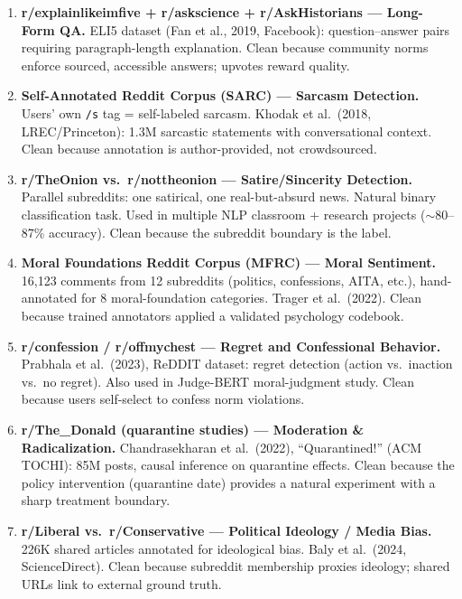 {\begin{enumerate}
    \item \textbf{r/explainlikeimfive + r/askscience + r/AskHistorians --- Long-Form QA.}
          ELI5 dataset (Fan et al., 2019, Facebook): question--answer pairs
          requiring paragraph-length explanation. Clean because community norms
          enforce sourced, accessible answers; upvotes reward quality.

    \item \textbf{Self-Annotated Reddit Corpus (SARC) --- Sarcasm Detection.}
          Users' own \texttt{/s} tag = self-labeled sarcasm. Khodak et al.\ (2018,
          LREC/Princeton): 1.3M sarcastic statements with conversational context.
          Clean because annotation is author-provided, not crowdsourced.

    \item \textbf{r/TheOnion vs.\ r/nottheonion --- Satire/Sincerity Detection.}
          Parallel subreddits: one satirical, one real-but-absurd news. Natural
          binary classification task. Used in multiple NLP classroom + research
          projects ($\sim$80--87\% accuracy). Clean because the subreddit boundary
          is the label.

    \item \textbf{Moral Foundations Reddit Corpus (MFRC) --- Moral Sentiment.}
          16,123 comments from 12 subreddits (politics, confessions, AITA, etc.),
          hand-annotated for 8 moral-foundation categories. Trager et al.\ (2022).
          Clean because trained annotators applied a validated psychology codebook.

    \item \textbf{r/confession / r/offmychest --- Regret and Confessional Behavior.}
          Prabhala et al.\ (2023), ReDDIT dataset: regret detection (action vs.\
          inaction vs.\ no regret). Also used in Judge-BERT moral-judgment study.
          Clean because users self-select to confess norm violations.

    \item \textbf{r/The\_Donald (quarantine studies) --- Moderation \& Radicalization.}
          Chandrasekharan et al.\ (2022), ``Quarantined!'' (ACM TOCHI): 85M posts,
          causal inference on quarantine effects. Clean because the policy intervention
          (quarantine date) provides a natural experiment with a sharp treatment boundary.

    \item \textbf{r/Liberal vs.\ r/Conservative --- Political Ideology / Media Bias.}
          226K shared articles annotated for ideological bias. Baly et al.\ (2024,
          ScienceDirect). Clean because subreddit membership proxies ideology;
          shared URLs link to external ground truth.
\end{enumerate}

}
